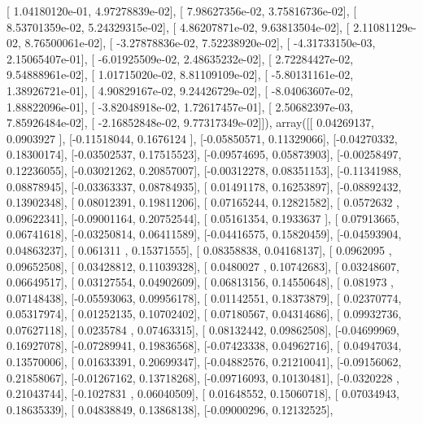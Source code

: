 \documentclass{article}
\begin{document}
       [  1.04180120e-01,   4.97278839e-02],
       [  7.98627356e-02,   3.75816736e-02],
       [  8.53701359e-02,   5.24329315e-02],
       [  4.86207871e-02,   9.63813504e-02],
       [  2.11081129e-02,   8.76500061e-02],
       [ -3.27878836e-02,   7.52238920e-02],
       [ -4.31733150e-03,   2.15065407e-01],
       [ -6.01925509e-02,   2.48635232e-02],
       [  2.72284427e-02,   9.54888961e-02],
       [  1.01715020e-02,   8.81109109e-02],
       [ -5.80131161e-02,   1.38926721e-01],
       [  4.90829167e-02,   9.24426729e-02],
       [ -8.04063607e-02,   1.88822096e-01],
       [ -3.82048918e-02,   1.72617457e-01],
       [  2.50682397e-03,   7.85926484e-02],
       [ -2.16852848e-02,   9.77317349e-02]]), array([[ 0.04269137,  0.0903927 ],
       [-0.11518044,  0.1676124 ],
       [-0.05850571,  0.11329066],
       [-0.04270332,  0.18300174],
       [-0.03502537,  0.17515523],
       [-0.09574695,  0.05873903],
       [-0.00258497,  0.12236055],
       [-0.03021262,  0.20857007],
       [-0.00312278,  0.08351153],
       [-0.11341988,  0.08878945],
       [-0.03363337,  0.08784935],
       [ 0.01491178,  0.16253897],
       [-0.08892432,  0.13902348],
       [ 0.08012391,  0.19811206],
       [ 0.07165244,  0.12821582],
       [ 0.0572632 ,  0.09622341],
       [-0.09001164,  0.20752544],
       [ 0.05161354,  0.1933637 ],
       [ 0.07913665,  0.06741618],
       [-0.03250814,  0.06411589],
       [-0.04416575,  0.15820459],
       [-0.04593904,  0.04863237],
       [ 0.061311  ,  0.15371555],
       [ 0.08358838,  0.04168137],
       [ 0.0962095 ,  0.09652508],
       [ 0.03428812,  0.11039328],
       [ 0.0480027 ,  0.10742683],
       [ 0.03248607,  0.06649517],
       [ 0.03127554,  0.04902609],
       [ 0.06813156,  0.14550648],
       [ 0.081973  ,  0.07148438],
       [-0.05593063,  0.09956178],
       [ 0.01142551,  0.18373879],
       [ 0.02370774,  0.05317974],
       [ 0.01252135,  0.10702402],
       [ 0.07180567,  0.04314686],
       [ 0.09932736,  0.07627118],
       [ 0.0235784 ,  0.07463315],
       [ 0.08132442,  0.09862508],
       [-0.04699969,  0.16927078],
       [-0.07289941,  0.19836568],
       [-0.07423338,  0.04962716],
       [ 0.04947034,  0.13570006],
       [ 0.01633391,  0.20699347],
       [-0.04882576,  0.21210041],
       [-0.09156062,  0.21858067],
       [-0.01267162,  0.13718268],
       [-0.09716093,  0.10130481],
       [-0.0320228 ,  0.21043744],
       [-0.1027831 ,  0.06040509],
       [ 0.01648552,  0.15060718],
       [ 0.07034943,  0.18635339],
       [ 0.04838849,  0.13868138],
       [-0.09000296,  0.12132525],
\end{document}
